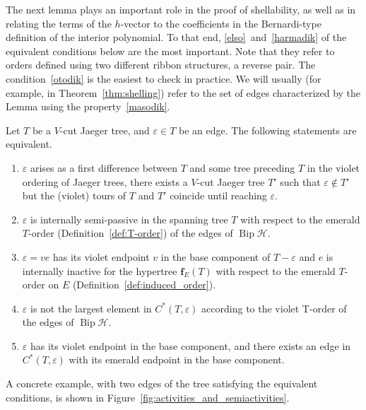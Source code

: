 \documentclass[ALCO,ThmDefs,Unicode,epreuves]{cedram}
\newcommand{\HH}{\mathcal H}
\DeclareMathOperator{\bip}{Bip}
\begin{document}
The next lemma plays an important role in the proof of shellability, as well as in relating the terms of the $h$-vector to the coefficients in the Bernardi-type definition of the interior polynomial. To that end, \ref{elso}~and~\ref{harmadik} of the equivalent conditions below are the most important. Note that they refer to orders defined using two different ribbon structures, a reverse pair. The condition~\ref{otodik} is the easiest to check in practice. We will usually (for example, in Theorem~\ref{thm:shelling}) refer to the set of edges characterized by the Lemma using the property~\ref{masodik}.

\begin{lemma}
\label{l:activities_description}
 Let $T$ be a $V$-cut Jaeger tree, and $\varepsilon \in T$ be an edge. The following statements are equivalent.
\begin{enumerate}[label=(\roman*)]
\item \label{elso}
 $\varepsilon$ arises as a first difference between $T$ and some tree preceding $T$ in the violet ordering of Jaeger trees, \ie there exists a $V$-cut Jaeger tree $T'$ such that $\varepsilon\not\in T'$ but the (violet) tours of $T$ and $T'$ coincide until reaching $\varepsilon$.
\item \label{masodik}
 $\varepsilon$ is internally semi-passive in the spanning tree $T$ with respect to the emerald $T$-order (Definition~\ref{def:T-order}) of the edges of $\bip \HH$.
\item \label{harmadik}
 $\varepsilon=ve$ has its violet endpoint $v$ in the base component of $T-\varepsilon$ and $e$ is internally inactive for the hypertree $\mathbf f_E(T)$ with respect to the emerald $T$-order on $E$ (Definition~\ref{def:induced_order}). 
\item \label{negyedik}
 $\varepsilon$ is not the largest element in $C^*(T,\varepsilon)$ according to the violet T-order of the edges of $\bip \HH$.
\item \label{otodik}
 $\varepsilon$ has its violet endpoint in the base component, and there exists an edge in $C^*(T,\varepsilon)$ with its emerald endpoint in the base component.
 \end{enumerate}
\end{lemma}

A concrete example, with two edges of the tree satisfying the equivalent conditions, is shown in Figure~\ref{fig:activities_and_semiactivities}.
\end{document}
